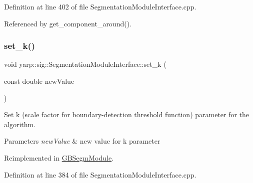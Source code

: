 Definition at line 402 of file Segmentation\+Module\+Interface.\+cpp.



Referenced by get\+\_\+component\+\_\+around().


\mbox{\label{classyarp_1_1sig_1_1SegmentationModuleInterface_a2851eae0226ad68f41cd8b61d8bb1456}} 
\subsubsection{\texorpdfstring{set\+\_\+k()}{set\_k()}}
{\footnotesize\ttfamily void yarp\+::sig\+::\+Segmentation\+Module\+Interface\+::set\+\_\+k (\begin{DoxyParamCaption}\item[{const double}]{new\+Value }\end{DoxyParamCaption})\hspace{0.3cm}{\ttfamily [virtual]}}



Set k (scale factor for boundary-\/detection threshold function) parameter for the algorithm. 


\begin{DoxyParams}{Parameters}
{\em new\+Value} & new value for k parameter \\
\hline
\end{DoxyParams}


Reimplemented in \hyperlink{classGBSegmModule_a15129913273e221a46c428f697e40575}{G\+B\+Segm\+Module}.



Definition at line 384 of file Segmentation\+Module\+Interface.\+cpp.



